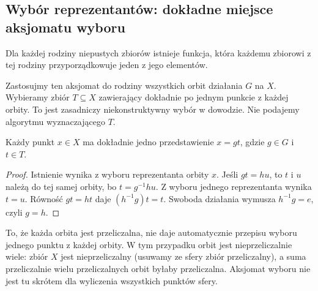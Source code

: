 \subsection{Wybór reprezentantów: dokładne miejsce aksjomatu wyboru}
\begin{definicja}
Dla każdej rodziny niepustych zbiorów istnieje funkcja, która każdemu zbiorowi z tej rodziny przyporządkowuje jeden z jego elementów.
\end{definicja}
Zastosujmy ten aksjomat do rodziny wszystkich orbit działania $G$ na $X$. Wybieramy zbiór $T\subseteq X$ zawierający dokładnie po jednym punkcie z każdej orbity. To jest zasadniczy niekonstruktywny wybór w dowodzie. Nie podajemy algorytmu wyznaczającego $T$.
\begin{lemat}\label{lem:wspolrzedne-orbitowe}
Każdy punkt $x\in X$ ma dokładnie jedno przedstawienie $x=gt$, gdzie $g\in G$ i $t\in T$.
\end{lemat}
\begin{proof}
Istnienie wynika z wyboru reprezentanta orbity $x$. Jeśli $gt=hu$, to $t$ i $u$ należą do tej samej orbity, bo $t=g^{-1}hu$. Z wyboru jednego reprezentanta wynika $t=u$. Równość $gt=ht$ daje $(h^{-1}g)t=t$. Swoboda działania wymusza $h^{-1}g=e$, czyli $g=h$.
\end{proof}
\begin{uwaga}
To, że każda orbita jest przeliczalna, nie daje automatycznie przepisu wyboru jednego punktu z każdej orbity. W tym przypadku orbit jest nieprzeliczalnie wiele: zbiór $X$ jest nieprzeliczalny (usuwamy ze sfery zbiór przeliczalny), a suma przeliczalnie wielu przeliczalnych orbit byłaby przeliczalna. Aksjomat wyboru nie jest tu skrótem dla wyliczenia wszystkich punktów sfery.
\end{uwaga}

